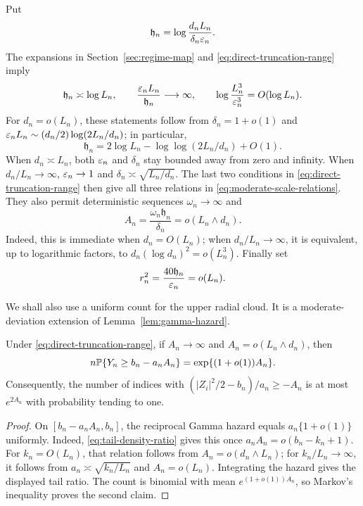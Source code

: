 Put
\[
  \mathfrak h_n=\log\frac{d_nL_n}{\delta_n\varepsilon_n}.
\]
The expansions in Section~\ref{sec:regime-map} and
\eqref{eq:direct-truncation-range} imply
\begin{equation}
\label{eq:moderate-scale-relations}
  \mathfrak h_n\asymp\log L_n,
  \qquad
  \frac{\varepsilon_nL_n}{\mathfrak h_n}\longrightarrow\infty,
  \qquad
  \log\frac{L_n^3}{\varepsilon_n^3}=O(\log L_n).
\end{equation}
For \(d_n=o(L_n)\), these statements follow from
\(\delta_n=1+o(1)\) and
\(\varepsilon_nL_n\sim(d_n/2)\log(2L_n/d_n)\); in particular,
\[
 \mathfrak h_n=2\log L_n-\log\log(2L_n/d_n)+O(1).
\]
When \(d_n\asymp L_n\), both \(\varepsilon_n\) and \(\delta_n\) stay bounded away
from zero and infinity.  When \(d_n/L_n\to\infty\),
\(\varepsilon_n\to1\) and \(\delta_n\asymp\sqrt{L_n/d_n}\).  The last two
conditions in \eqref{eq:direct-truncation-range} then give all three relations in
\eqref{eq:moderate-scale-relations}.
They also permit deterministic sequences \(\omega_n\to\infty\) and
\begin{equation}
\label{eq:moderate-cutoff}
  A_n=\frac{\omega_n\mathfrak h_n}{\delta_n}
  =o(L_n\wedge d_n).
\end{equation}
Indeed, this is immediate when \(d_n=O(L_n)\); when \(d_n/L_n\to\infty\),
it is equivalent, up to logarithmic factors, to
\(d_n(\log d_n)^2=o(L_n^3)\). Finally set
\begin{equation}
\label{eq:moderate-inner-radius}
  r_n^2=\frac{40\mathfrak h_n}{\varepsilon_n}=o(L_n).
\end{equation}

We shall also use a uniform count for the upper radial cloud.  It is a
moderate-deviation extension of Lemma~\ref{lem:gamma-hazard}.

\begin{lemma}
\label{lem:moderate-upper-count}
Under \eqref{eq:direct-truncation-range}, if \(A_n\to\infty\) and
\(A_n=o(L_n\wedge d_n)\), then
\[
 n\mathbb P\{Y_n\ge b_n-a_nA_n\}
 =\exp\{(1+o(1))A_n\}.
\]
Consequently, the number of indices with
\((|Z_i|^2/2-b_n)/a_n\ge-A_n\) is at most \(e^{2A_n}\) with probability
tending to one.
\end{lemma}

\begin{proof}
On \([b_n-a_nA_n,b_n]\), the reciprocal Gamma hazard equals
\(a_n\{1+o(1)\}\) uniformly.  Indeed,
\eqref{eq:tail-density-ratio} gives this once
\(a_nA_n=o(b_n-k_n+1)\).  For \(k_n=O(L_n)\), that relation follows from
\(A_n=o(d_n\wedge L_n)\); for \(k_n/L_n\to\infty\), it follows from
\(a_n\asymp\sqrt{k_n/L_n}\) and \(A_n=o(L_n)\).  Integrating the
hazard gives the displayed tail ratio.  The count is binomial with mean
\(e^{(1+o(1))A_n}\), so Markov's inequality proves the second claim.
\end{proof}


